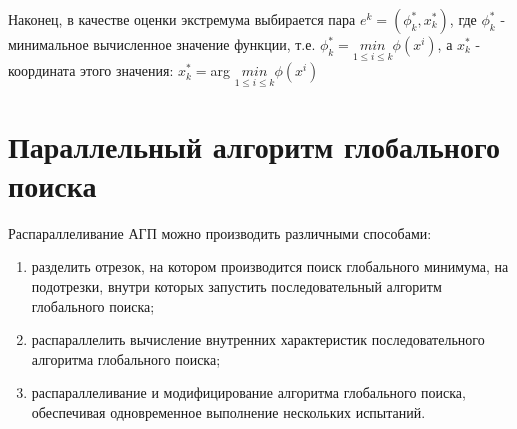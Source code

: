 \documentclass{report}
\begin{document}
Наконец, в качестве оценки экстремума выбирается пара $e^k=(\phi_k^*,x_k^*)$, где
$\phi_k^*$ - минимальное вычисленное значение функции, т.е. $\phi_k^*=\underset{1\leq i\leq k}{min}⁡\phi(x^i)$, а $x_k^*$ - координата этого значения: $x_k^* = $arg $\underset{1\leq i\leq k}{min} \phi (x^i)$


\newpage

\section{Параллельный алгоритм глобального поиска}

Распараллеливание АГП можно производить различными способами:

\begin{enumerate}
    \item разделить отрезок, на котором производится поиск глобального минимума, на подотрезки, внутри которых запустить последовательный алгоритм глобального поиска;
    \item распараллелить вычисление внутренних характеристик последовательного алгоритма глобального поиска;
    \item распараллеливание и модифицирование алгоритма глобального поиска, обеспечивая одновременное выполнение нескольких испытаний.
\end{enumerate}
\end{document}
